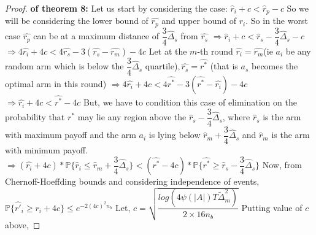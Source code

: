 \begin{proof}\textbf{ of theorem 8:}
Let us start by considering the case:
\newline 
\hspace*{8em}$\hat{r}_{i}+c<\hat{r}_{p}-c$
\newline
So we will be considering the lower bound of $\hat{r_{p}}$ and upper bound of $\hat{r_{i}}$. So in the worst case $\hat{r_{p}}$ can be at a maximum distance of $\dfrac{3}{4}\hat{\Delta}_{s}$ from $\hat{r_{s}}$ 
\newline \hspace*{8em}$\Rightarrow \hat{r}_{i} + c <  \hat{r}_{s} - \dfrac{3}{4}\hat{\Delta}_{s} - c$
\newline \hspace*{8em}$\Rightarrow 4\hat{r_{i}} + 4c < 4\hat{r_{s}} - 3(\hat{r_{s}}-\hat{r_{m}}) - 4c$
\newline Let at the $m$-th round $\hat{r_{i}}=\hat{r_{m}}$(ie $a_{i}$ be any random arm which is below the $\dfrac{3}{4}\hat{\Delta}_{s}$ quartile)$,\hat{r_{s}}=\hat{r^{*}}$ (that is $a_{s}$ becomes the optimal arm in this round)
\newline \hspace*{8em}$\Rightarrow 4\hat{r_{i}} + 4c < 4\hat{r^{*}} - 3(\hat{r^{*}}-\hat{r_{i}}) - 4c$
\newline \hspace*{8em}$\Rightarrow \hat{r_{i}} + 4c < \hat{r^{*}} - 4c$
\newline
But, we have to condition this case of elimination on the probability that $r^{*}$ may lie any region above the $\hat{r}_{s}-\dfrac{3}{4}\hat{\Delta}_{s}$, where $\hat{r}_{s}$ is the arm with maximum payoff and the arm $a_{i}$ is lying below $\hat{r}_{m}+\dfrac{3}{4}\hat{\Delta}_{s}$ and $\hat{r}_{m}$ is the arm with minimum payoff.
\newline
\hspace*{8em}$\Rightarrow (\hat{r_{i}} + 4c)*\mathbb{P}\lbrace \hat{r}_{i} \leq \hat{r}_{m} + \dfrac{3}{4}\hat{\Delta}_{s}\rbrace < (\hat{r^{*}} - 4c)*\mathbb{P}\lbrace \hat{r^{*}} \geq \hat{r}_{s} - \dfrac{3}{4}\hat{\Delta}_{s} \rbrace$
\newline
Now, from Chernoff-Hoeffding bounds and considering independence of events,
\newline $\mathbb{P} \lbrace \hat{r'}_{i} \geq r_{i} + 4c \rbrace \leq e^{-2(4c)^{2}n_{b}}$
\newline 
Let, $c= \sqrt{\dfrac{log({4\psi(|A|)T\tilde{\Delta}_{m}^{2}})}{2\times 16n_{b}}}$
\newline Putting value of $c$ above,

\end{proof}
